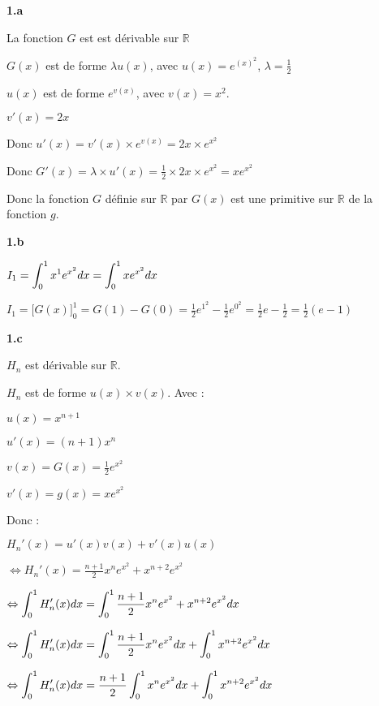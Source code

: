 \documentclass{article}
\newcommand{\vspacem}{\vspace{2mm}}
\newcommand{\bfrac}[2]{\displaystyle\frac{#1}{#2}}
\begin{document}
\textbf{1.a}
\vspacem

\noindent La fonction $G$ est est dérivable sur $\mathbb{R}$ 

\noindent  $G(x)$ est de forme $\lambda u(x)$, avec $u(x) = e^{(x)^2}$, $\lambda = \displaystyle\frac{1}{2}$

\noindent $u(x)$ est de forme $e^{v(x)}$, avec $v(x) = x^2$.

$v'(x) = 2x$

\noindent Donc $u'(x) = v'(x)\times e^{v(x)} = 2x\times e^{x^2}$

\noindent Donc $G'(x) = \lambda \times u'(x) = \bfrac{1}{2} \times 2x \times e^{x^2} = x e^{x^2}$

\noindent Donc la fonction $G$ définie sur $\mathbb{R}$ par $G(x)$ est une primitive sur $\mathbb{R}$ de la fonction $g$.

\vspacem
\textbf{1.b}
\vspacem

\noindent $I_1 = \displaystyle\int^1_0 x^1 e^{x^2} \space dx = \displaystyle\int^1_0 xe^{x^2} dx$

\noindent $I_1 = \Big[ G(x) \Big]^1_0 = G(1) - G(0) = \bfrac{1}{2}e^{1^2} - \bfrac{1}{2}e^{0^2} = \bfrac{1}{2} e - \bfrac{1}{2} = \bfrac{1}{2}(e-1)$

\vspacem
\textbf{1.c}
\vspacem

\noindent $H_n$ est dérivable sur $\mathbb{R}$.

\noindent $H_n$ est de forme $u(x) \times v(x)$. Avec :

$u(x) = x^{n+1}$

$u'(x) = (n+1) x^n$

$v(x) = G(x) = \bfrac{1}{2} e^{x^2}$

$v'(x) = g(x) = xe^{x^2}$

\noindent Donc :

$H_n'(x) = u'(x) v(x) + v'(x) u(x)$

$\Leftrightarrow H_n'(x) = \bfrac{n+1}{2}  x^n e^{x^2} + x^{n+2} e^{x^2}$

$\Leftrightarrow \displaystyle\int_0^1 H_n'(x) \space dx = \displaystyle\int_0^1 \frac{n+1}{2} x^n e^{x^2} +  x^{n+2} e^{x^2} \space dx$

$\Leftrightarrow \displaystyle\int_0^1 H_n'(x) \space dx = \displaystyle\int_0^1 \frac{n+1}{2} x^n e^{x^2} \space dx + \displaystyle\int_0^1  x^{n+2} e^{x^2} \space dx$ 


$\Leftrightarrow \displaystyle\int_0^1 H_n'(x) \space dx = \bfrac{n+1}{2} \displaystyle\int_0^1 x^n e^{x^2} \space dx + \displaystyle\int_0^1  x^{n+2} e^{x^2} \space dx$
\end{document}
